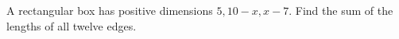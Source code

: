 A rectangular box has positive dimensions $5,10-x,x-7$. Find the sum of the lengths of all twelve edges.
